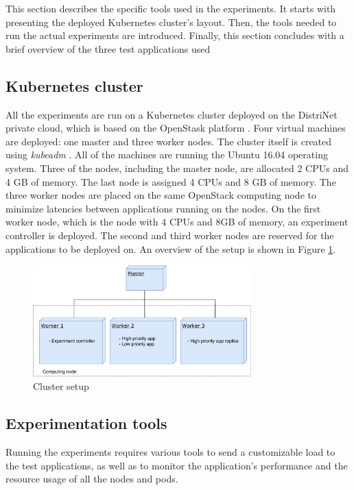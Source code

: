This section describes the specific tools used in the experiments. It starts with presenting the deployed Kubernetes cluster's layout. Then, the tools needed to run the actual experiments are introduced. Finally, this section concludes with a brief overview of the three test applications used

\subsection{Kubernetes cluster}
\label{cluster}
All the experiments are run on a Kubernetes cluster deployed on the DistriNet private cloud, which is based on the OpenStask platform \citep{openstack}. Four virtual machines are deployed: one master and three worker nodes. The cluster itself is created using \textit{kubeadm} \citep{kubeadm}. All of the machines are running the Ubuntu 16.04 operating system. Three of the nodes, including the master node, are allocated 2 CPUs and 4 GB of memory. The last node is assigned 4 CPUs and 8 GB of memory. The three worker nodes are placed on the same OpenStack computing node to minimize latencies between applications running on the nodes. On the first worker node, which is the node with 4 CPUs and 8GB of memory, an experiment controller is deployed. The second and third worker nodes are reserved for the applications to be deployed on. An overview of the setup is shown in Figure \ref{fig:cluster}.

\setlength\abovecaptionskip{3pt}
\begin{figure}[h]
\centering
\includegraphics[width=0.75\textwidth]{Images/Setup/Cluster.pdf}
\caption{Cluster setup}
\label{fig:cluster} 
\end{figure}


\subsection{Experimentation tools}
\label{tools}

Running the experiments requires various tools to send a customizable load to the test applications, as well as to monitor the application's performance and the resource usage of all the nodes and pods. 


